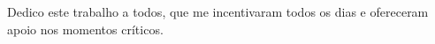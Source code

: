 Dedico este trabalho a todos, que me incentivaram todos os dias e ofereceram apoio nos momentos críticos.
